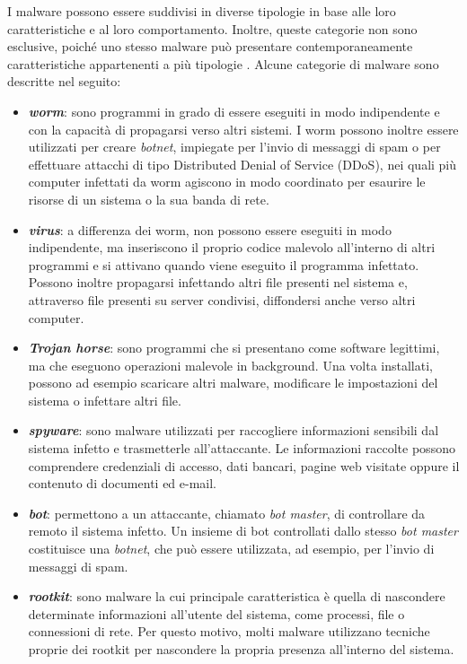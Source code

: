 I malware possono essere suddivisi in diverse tipologie in base alle
loro caratteristiche e al loro comportamento. Inoltre, queste categorie
non sono esclusive, poiché uno stesso malware può presentare
contemporaneamente caratteristiche appartenenti a più tipologie
\cite{egele2012}.
Alcune categorie di malware sono descritte nel seguito:
\begin{itemize}
    \item \textbf{\textit{worm}}: sono programmi in grado di essere eseguiti
    in modo indipendente e con la capacità di propagarsi verso altri
    sistemi. I worm possono inoltre essere utilizzati per creare
    \textit{botnet}, impiegate per l'invio di messaggi di spam o per
    effettuare attacchi di tipo Distributed Denial of Service (DDoS),
    nei quali più computer infettati da worm agiscono in modo coordinato
    per esaurire le risorse di un sistema o la sua banda di rete.

    \item \textbf{\textit{virus}}: a differenza dei worm, non possono essere
    eseguiti in modo indipendente, ma inseriscono il proprio codice malevolo
    all'interno di altri programmi e si attivano quando viene eseguito
    il programma infettato. Possono inoltre propagarsi infettando altri
    file presenti nel sistema e, attraverso file presenti su server
    condivisi, diffondersi anche verso altri computer.

    \item \textbf{\textit{Trojan horse}}: sono programmi che si presentano
    come software legittimi, ma che eseguono operazioni malevole in
    background. Una volta installati, possono ad esempio scaricare altri
    malware, modificare le impostazioni del sistema o infettare altri file.

    \item \textbf{\textit{spyware}}: sono malware utilizzati per raccogliere
    informazioni sensibili dal sistema infetto e trasmetterle all'attaccante.
    Le informazioni raccolte possono comprendere credenziali di accesso,
    dati bancari, pagine web visitate oppure il contenuto di documenti
    ed e-mail.

    \item \textbf{\textit{bot}}: permettono a un attaccante, chiamato
    \textit{bot master}, di controllare da remoto il sistema infetto.
    Un insieme di bot controllati dallo stesso \textit{bot master}
    costituisce una \textit{botnet}, che può essere utilizzata, ad esempio,
    per l'invio di messaggi di spam.

    \item \textbf{\textit{rootkit}}: sono malware la cui principale
    caratteristica è quella di nascondere determinate informazioni
    all'utente del sistema, come processi, file o connessioni di rete.
    Per questo motivo, molti malware utilizzano tecniche proprie dei
    rootkit per nascondere la propria presenza all'interno del sistema.
\end{itemize}

